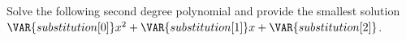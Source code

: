 Solve the following second degree polynomial and provide the smallest solution  $\VAR{substitution[0]}x^2 + \VAR{substitution[1]}x + \VAR{substitution[2]}$.
